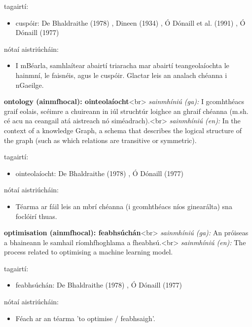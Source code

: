 \documentclass{article}
\begin{document}
tagairtí:
\begin{itemize}
	\item cuspóir: De Bhaldraithe (1978) \cite{de-bhaldraithe}, Dineen (1934) \cite{dineen}, Ó Dónaill et al. (1991) \cite{focloir-beag}, Ó Dónaill (1977) \cite{odonaill}
\end{itemize}

nótaí aistriúcháin:
\begin{itemize}
	\item I mBéarla, samhlaítear abairtí triaracha mar abairtí teangeolaíochta le hainmní, le faisnéis, agus le cuspóir. Glactar leis an analach chéanna i nGaeilge.
\end{itemize}


\textbf{ontology (ainmfhocal): ointeolaíocht}<br>
\textit{sainmhíniú (ga):} I gcomhthéacs graif eolais, scéimre a chuireann in iúl struchtúr loighce an ghraif chéanna (m.sh. cé acu na ceangail atá aistreach nó siméadrach).<br>
\textit{sainmhíniú (en):} In the context of a knowledge Graph, a schema that describes the logical structure of the graph (such as which relations are transitive or symmetric).

tagairtí:
\begin{itemize}
	\item ointeolaíocht: De Bhaldraithe (1978) \cite{de-bhaldraithe}, Ó Dónaill (1977) \cite{odonaill}
\end{itemize}

nótaí aistriúcháin:
\begin{itemize}
	\item Téarma ar fáil leis an mbrí chéanna (i gcomhthéacs níos ginearálta) sna foclóirí thuas.
\end{itemize}


\textbf{optimisation (ainmfhocal): feabhsúchán}<br>
\textit{sainmhíniú (ga):} An próiseas a bhaineann le samhail ríomhfhoghlama a fheabhsú.<br>
\textit{sainmhíniú (en):} The process related to optimising a machine learning model.

tagairtí:
\begin{itemize}
	\item feabhsúchán: De Bhaldraithe (1978) \cite{de-bhaldraithe}, Ó Dónaill (1977) \cite{odonaill}
\end{itemize}

nótaí aistriúcháin:
\begin{itemize}
	\item Féach ar an téarma 'to optimise / feabhsaigh'.
\end{itemize}
\end{document}
